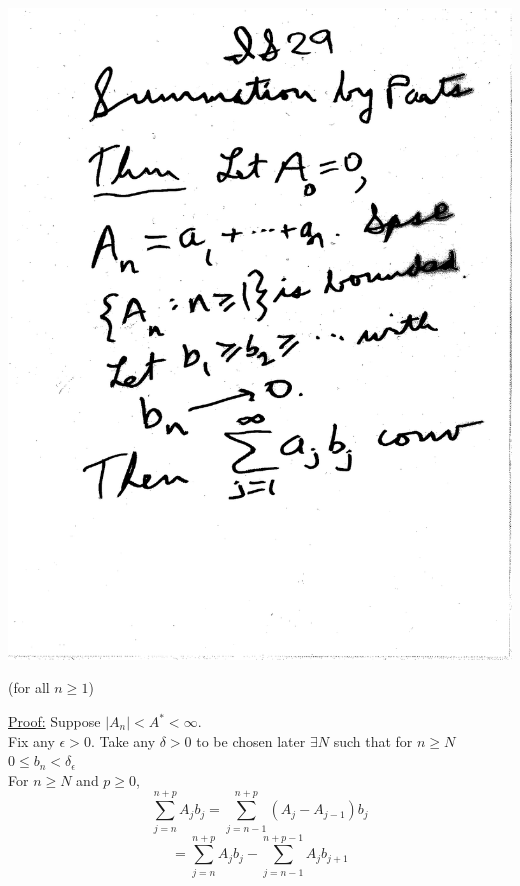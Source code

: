 \documentclass[10pt,a4paper]{article}
\begin{document}
\includegraphics[scale=.5]{Pages/IS_29}

\newpage

\begin{center}
(for all $n\geq 1$)
\end{center}
\vspace{3mm}
\noindent \underline{Proof:} Suppose $|A_n| < A^* <\infty$.
\\Fix any $\epsilon > 0$. Take any $\delta > 0$ to be chosen later $\exists  N$ such that for $n\geq N$ $0 \leq b_n < \delta_\epsilon$
\\ For $n \geq N$ and $p \geq 0$,
$$ \sum_{j=n}^{n+p} A_j b_j = \sum_{j=n-1}^{n+p} (A_j - A_{j-1}) b_j$$ 
$$= \sum_{j=n}^{n+p} A_j b_j - \sum_{j=n-1}^{n+p-1} A_j b_{j+1}$$
\end{document}
